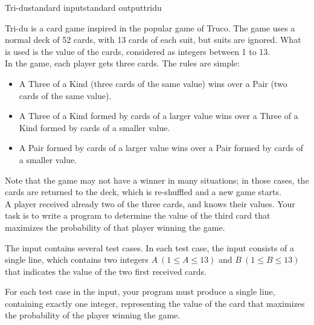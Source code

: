 \begin{problem}{Tri-du}{standard input}{standard output}{tridu}

Tri-du is a card game inspired in the popular game of Truco. The game uses a normal deck of 52
cards, with 13 cards of each suit, but suits are ignored. What is used is the value of the cards,
considered as integers between 1 to 13.\\
In the game, each player gets three cards. The rules are simple:

\begin{itemize}
  \item A Three of a Kind (three cards of the same value) wins over a Pair (two cards of the same
        value).
  \item A Three of a Kind formed by cards of a larger value wins over a Three of a Kind formed by
        cards of a smaller value.
  \item A Pair formed by cards of a larger value wins over a Pair formed by cards of a smaller
        value.
\end{itemize}

Note that the game may not have a winner in many situations; in those cases, the cards are returned
to the deck, which is re-shuffled and a new game starts.\\
A player received already two of the three cards, and knows their values. Your task is to write a
program to determine the value of the third card that maximizes the probability of that player
winning the game.

\InputFile

The input contains several test cases. In each test case, the input consists of a single line, which
contains two integers $A\ (1 \leq A \leq 13)$ and $B\ (1 \leq B \leq 13)$ that indicates the value of
the two first received cards.

\OutputFile

For each test case in the input, your program must produce a single line, containing exactly one
integer, representing the value of the card that maximizes the probability of the player winning the
game.

\Example

\begin{example}
%
\end{example}

\end{problem}
